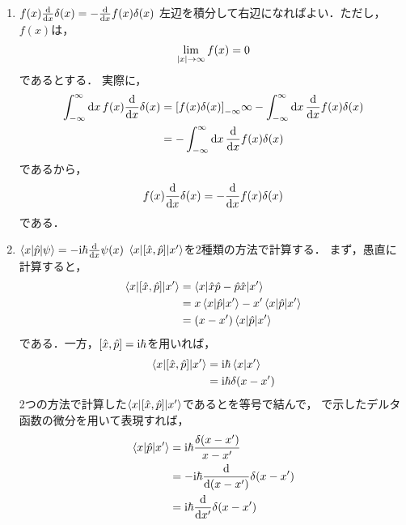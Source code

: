 \documentclass{report}
\begin{document}
    \begin{enumerate}
      \item $f(x)\dv{x}\delta(x) = -\dv{x}f(x)\delta(x)$
        左辺を積分して右辺になればよい．ただし，$f(x)$は，
        \begin{align}
          \lim_{\abs{x} \to \infty}f(x) = 0
        \end{align}
        であるとする．
        実際に，
        \begin{align}
          \int_{-\infty}^{\infty}\dd{x}f(x)\dv{x}\delta(x) &= \qty[f(x)\delta(x)]_{-\infty}{\infty} - \int_{-\infty}^{\infty}\dd{x}\dv{x}f(x)\delta(x) \\ 
          &= - \int_{-\infty}^{\infty}\dd{x}\dv{x}f(x)\delta(x)
        \end{align}
        であるから，
        \begin{align}
          f(x)\dv{x}\delta(x) = -\dv{x}f(x)\delta(x)\label{delta-function-diff}
        \end{align}
        である．
      \item $\mel**{x}{\hat{p}}{\psi} = -\mathrm{i}\hbar\dv{x}\psi(x)$
        $\mel**{x}{\qty[\hat{x}, \hat{p}]}{x'}$を2種類の方法で計算する．
        まず，愚直に計算すると，
        \begin{align}
          \mel**{x}{\qty[\hat{x}, \hat{p}]}{x'} &= \mel**{x}{\hat{x}\hat{p} - \hat{p}\hat{x}}{x'} \\ 
          &= x\mel**{x}{\hat{p}}{x'} - x'\mel**{x}{\hat{p}}{x'} \\ 
          &= \qty(x - x')\mel**{x}{\hat{p}}{x'}\label{xxpxprime-1}
        \end{align}
        である．一方，$\qty[\hat{x}, \hat{p}] = \mathrm{i}\hbar$を用いれば，
        \begin{align}
          \mel**{x}{\qty[\hat{x}, \hat{p}]}{x'} &= \mathrm{i}\hbar\braket{x}{x'} \\ 
          &= \mathrm{i}\hbar\delta(x - x')\label{xxpxprime-2}
        \end{align}
        2つの方法で計算した$\mel**{x}{\qty[\hat{x}, \hat{p}]}{x'}$であるとを等号で結んで，
        で示したデルタ函数の微分を用いて表現すれば，
        \begin{align}
          \mel**{x}{\hat{p}}{x'} &= \mathrm{i}\hbar\frac{\delta(x - x')}{x - x'} \\ 
          &= -\mathrm{i}\hbar\dv{\qty(x - x')}\delta(x - x') \\ 
          &= \mathrm{i}\hbar\dv{x'}\delta(x - x')\label{xpxrime}
        \end{align}

\end{enumerate}
\end{document}
